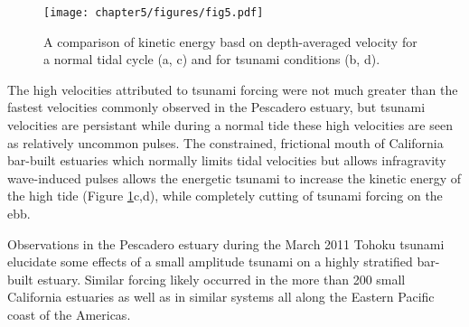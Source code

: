 \begin{figure}
\texttt{[image: chapter5/figures/fig5.pdf]}

\protect\caption{A comparison of kinetic energy basd on depth-averaged velocity for
a normal tidal cycle (a, c) and for tsunami conditions (b, d). \label{fig:kinetic_energy}}
\end{figure}


The high velocities attributed to tsunami forcing were not much greater
than the fastest velocities commonly observed in the Pescadero estuary,
but tsunami velocities are persistant while during a normal tide these
high velocities are seen as relatively uncommon pulses. The constrained,
frictional mouth of California bar-built estuaries which normally
limits tidal velocities but allows infragravity wave-induced pulses
allows the energetic tsunami to increase the kinetic energy of the
high tide (Figure \ref{fig:kinetic_energy}c,d), while completely
cutting of tsunami forcing on the ebb. 

Observations in the Pescadero estuary during the March 2011 Tohoku
tsunami elucidate some effects of a small amplitude tsunami on a highly
stratified bar-built estuary. Similar forcing likely occurred in the
more than 200 small California estuaries as well as in similar
systems all along the Eastern Pacific coast of the Americas. 





